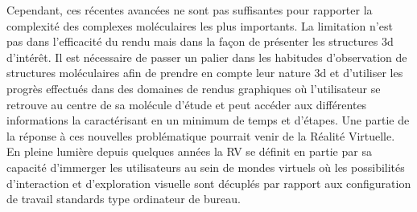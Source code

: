 Cependant, ces récentes avancées ne sont pas suffisantes pour rapporter la complexité des complexes moléculaires les plus importants. La limitation n'est pas dans l'efficacité du rendu mais dans la façon de présenter les structures 3d d'intérêt. Il est nécessaire de passer un palier dans les habitudes d'observation de structures moléculaires afin de prendre en compte leur nature 3d et d'utiliser les progrès effectués dans des domaines de rendus graphiques où l'utilisateur se retrouve au centre de sa molécule d'étude et peut accéder aux différentes informations la caractérisant en un minimum de temps et d'étapes. Une partie de la réponse à ces nouvelles problématique pourrait venir de la Réalité Virtuelle. En pleine lumière depuis quelques années la RV se définit en partie par sa capacité d'immerger les utilisateurs au sein de mondes virtuels où les possibilités d'interaction et d'exploration visuelle sont décuplés par rapport aux configuration de travail standards type ordinateur de bureau. 









